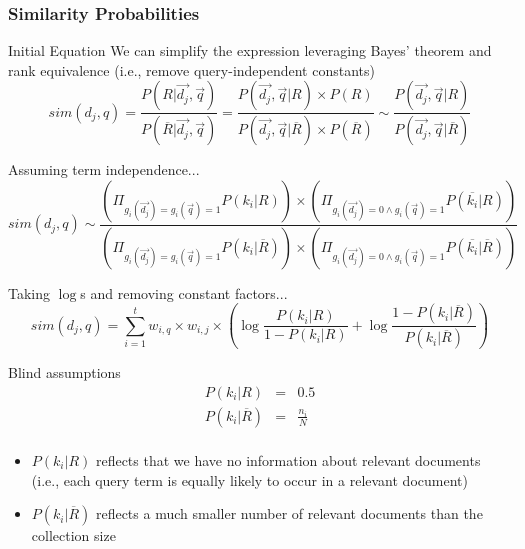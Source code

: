 \documentclass[svgnames]{beamer}
\begin{document}
\begin{frame}[allowframebreaks]
  \frametitle{Similarity Probabilities}

  \begin{block}{Initial Equation}
    We can simplify the expression leveraging Bayes’ theorem and rank equivalence (i.e., remove query-independent constants)
    \small
    \begin{displaymath}
        sim(d_j,q) = \frac{P(R|\vec{d_j},\vec{q})}{P(\overline{R}|\vec{d_j},\vec{q})}
        = \frac{P(\vec{d_j},\vec{q}|R) \times P(R)}{P(\vec{d_j},\vec{q}|\overline{R}) \times
          P(\overline{R})}
        \sim \frac{P(\vec{d_j},\vec{q}|R)}{P(\vec{d_j},\vec{q}|\overline{R})}
     \end{displaymath}
  \end{block}

  \begin{block}{Assuming term independence...}
    \footnotesize
    \begin{displaymath}
      sim(d_j,q) \sim \frac{
        (\Pi_{g_i(\vec{d_j})=g_i(\vec{q})=1}P(k_i|R))\times(\Pi_{g_i(\vec{d_j})=0 \wedge g_i(\vec{q})=1}P(\overline{k_i}|R))
      }{
        (\Pi_{g_i(\vec{d_j})=g_i(\vec{q})=1}P(k_i|\overline{R}))\times(\Pi_{g_i(\vec{d_j})=0 \wedge g_i(\vec{q})=1}P(\overline{k_i}|\overline{R}))}
    \end{displaymath}
  \end{block}

  \begin{block}{Taking $\log$s and removing constant factors...}
    \small
    \begin{displaymath}      
      sim(d_j,q) = \sum_{i=1}^t w_{i,q} \times w_{i,j} \times
      \left(
        \log\frac{P(k_i|R)}{1-P(k_i|R)} + \log\frac{1-P(k_i|\overline{R})}{P(k_i|\overline{R})}
      \right)
    \end{displaymath}
  \end{block}

  \begin{block}{Blind assumptions}
    \begin{displaymath}
      \begin{array}{rcl}
        P(k_i|R) &=& 0.5\\
	P(k_i|\overline{R}) &=& \frac{n_i}{N}\\
      \end{array}
    \end{displaymath}
    \small
    \begin{itemize}
    \item $P(k_i|R)$ reflects that we have no information about relevant documents (i.e., each query term is equally likely to occur in a relevant document)
    \item $P(k_i|\overline{R})$ reflects a much smaller number of relevant documents than the collection size
    \end{itemize}
  \end{block}


\end{frame}
\end{document}
